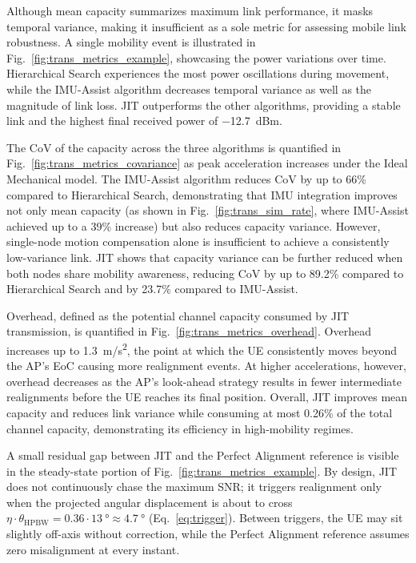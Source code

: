 \documentclass[fleqn,10pt]{wlscirep}
\begin{document}
Although mean capacity summarizes maximum link performance, it masks temporal variance, making it insufficient as a sole metric for assessing mobile link robustness. A single mobility event is illustrated in Fig.~\ref{fig:trans_metrics_example}, showcasing the power variations over time. Hierarchical Search experiences the most power oscillations during movement, while the IMU-Assist algorithm decreases temporal variance as well as the magnitude of link loss. JIT outperforms the other algorithms, providing a stable link and the highest final received power of \SI{-12.7}{dBm}.

The CoV of the capacity across the three algorithms is quantified in Fig.~\ref{fig:trans_metrics_covariance} as peak acceleration increases under the Ideal Mechanical model. The IMU-Assist algorithm reduces CoV by up to 66\% compared to Hierarchical Search, demonstrating that IMU integration improves not only mean capacity (as shown in Fig.~\ref{fig:trans_sim_rate}, where IMU-Assist achieved up to a 39\% increase) but also reduces capacity variance. However, single-node motion compensation alone is insufficient to achieve a consistently low-variance link. JIT shows that capacity variance can be further reduced when both nodes share mobility awareness, reducing CoV by up to 89.2\% compared to Hierarchical Search and by 23.7\% compared to IMU-Assist.

Overhead, defined as the potential channel capacity consumed by JIT transmission, is quantified in Fig.~\ref{fig:trans_metrics_overhead}. Overhead increases up to \SI{1.3}{m/s^2}, the point at which the UE consistently moves beyond the AP's EoC causing more realignment events. At higher accelerations, however, overhead decreases as the AP's look-ahead strategy results in fewer intermediate realignments before the UE reaches its final position. Overall, JIT improves mean capacity and reduces link variance while consuming at most 0.26\% of the total channel capacity, demonstrating its efficiency in high-mobility regimes.

A small residual gap between JIT and the Perfect Alignment reference is visible in the steady-state portion of Fig.~\ref{fig:trans_metrics_example}. By design, JIT does not continuously chase the maximum SNR; it triggers realignment only when the projected angular displacement is about to cross $\eta \cdot \theta_{\text{HPBW}} = 0.36 \cdot \SI{13}{\degree} \approx \SI{4.7}{\degree}$ (Eq.~\ref{eq:trigger}). Between triggers, the UE may sit slightly off-axis without correction, while the Perfect Alignment reference assumes zero misalignment at every instant.
\end{document}
